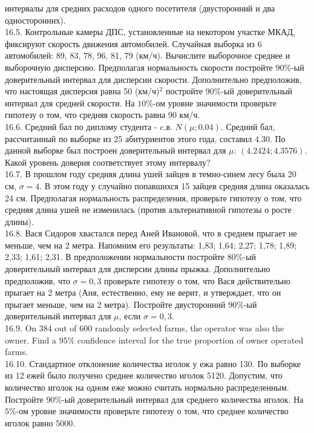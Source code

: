 \documentclass[pdftex,12pt,a4paper]{article}
\begin{document}
интервалы для средних расходов одного посетителя
(двусторонний и два односторонних). \\
16.5. Контрольные камеры ДПС, установленные на некотором участке
МКАД, фиксируют скорость  движения автомобилей. Случайная выборка
из 6 автомобилей: 89,  83, 78, 96, 81, 79 (км/ч). Вычислите
выборочное среднее и выборочную дисперсию. Предполагая
нормальность скорости постройте $90\%$-ый доверительный интервал
для дисперсии скорости. Дополнительно предположив, что настоящая
дисперсия равна 50 (км/ч)$^{2}$ постройте $90\%$-ый доверительный
интервал для средней скорости. На $10\%$-ом уровне значимости
проверьте гипотезу о том, что средняя скорость равна 90 км/ч. \\
16.6. Средний бал по диплому студента - c.в. $N(\mu;0.04)$.
Средний бал, рассчитанный по выборке из 25 абитуриентов этого
года, составил $4.30$. По данной выборке был построен
доверительный интервал для $\mu$: $(4.2424; 4.3576)$. Какой
уровень доверия соответствует этому
интервалу? \\
16.7. В прошлом году средняя длина ушей зайцев в темно-синем лесу
была 20 см, $\sigma=4$. В этом году у случайно попавшихся 15
зайцев средняя длина оказалась 24 см. Предполагая нормальность
распределения, проверьте гипотезу о том, что средняя длина ушей не
изменилась (против альтернативной гипотезы о росте длины). \\
16.8. Вася Сидоров хвастался перед Аней Ивановой, что в среднем
прыгает не меньше, чем на 2 метра. Напомним его результаты: 1,83;
1,64; 2,27; 1,78; 1,89; 2,33; 1,61; 2,31. В предположении
нормальности постройте $80\%$-ый доверительный интервал для
дисперсии длины прыжка. Дополнительно предположив, что
$\sigma=0,3$ проверьте гипотезу о том, что Вася действительно
прыгает на 2 метра (Аня, естественно, ему не верит, и утверждает,
что он прыгает меньше, чем на 2 метра). Постройте двусторонний
$90\%$-ый доверительный интервал для $\mu$, если $\sigma=0,3$. \\
16.9. On 384 out of 600 randomly selected farms, the operator was
also the owner. Find a $95\%$ confidence interval for the true
proportion of owner operated farms. \\
16.10. Стандартное отклонение количества иголок у ежа равно 130.
По выборке из 12 ежей было получено среднее количество иголок
5120. Допустим, что количество иголок на одном еже можно считать
нормально распределенным. Постройте $90\%$-ый доверительный
интервал для среднего количества иголок. На $5\%$-ом уровне
значимости проверьте гипотезу о том, что среднее количество иголок равно 5000. \\
\end{document}
